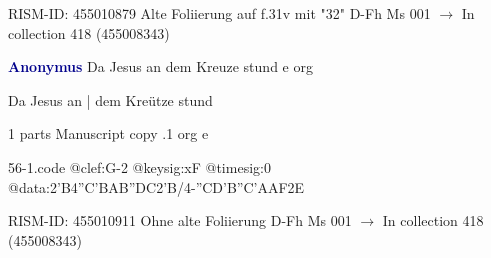 \documentclass[twocolumn]{book}
\begin{document}
\newline RISM-ID: 455010879
\newline Alte Foliierung auf f.31v mit "32"
\newline D-Fh  Ms 001
\newline $\rightarrow$ In collection 418 (455008343)

\newline \par \vspace{7pt} \textcolor{darkblue}{\textbf{Anonymus  }}
\newline Da Jesus an dem Kreuze stund  e  
\newline org
\newline \begin{itshape}[f.50v, at left:] Da Jesus an | dem Kreütze stund\end{itshape} 
\newline \textcolor{darkblue}{}  1 parts  
\newline Manuscript copy
.1  org  e  
\begin{filecontents*}{56-1.code}
@clef:G-2
@keysig:xF
@timesig:0
@data:2'B4''C'BAB''DC2'B/4-''CD'B''C'AAF2E
\end{filecontents*}
\newline
%

\newline RISM-ID: 455010911
\newline Ohne alte Foliierung
\newline D-Fh  Ms 001
\newline $\rightarrow$ In collection 418 (455008343)
\end{document}
